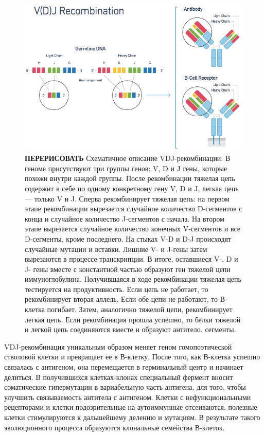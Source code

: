 \documentclass{spbau-diploma}
\begin{document}
\begin{figure}[h!]
    \centering
    \includegraphics[width=.9\textwidth]{figures/10x_vdj_recombination.png}
    \caption{\textbf{ПЕРЕРИСОВАТЬ} Схематичное описание VDJ-рекомбинации.
    В геноме присутствуют три группы генов: V, D и J гены, которые похожи внутри каждой группы.
    После рекомбинации тяжелая цепь содержит в себе по одному конкретному гену V, D и J, легкая цепь --- только V и J.
    Сперва рекомбинирует тяжелая цепь: на первом этапе рекомбинации вырезается случайное количество D-сегментов с конца и случайное количество J-сегментов с начала.
    На втором этапе вырезается случайное количество конечных V-сегментов и все D-сегменты, кроме последнего.
    На стыках V-D и D-J происходят случайные мутации и вставки.
    Лишние V- и J-гены затем вырезаются в процессе транскрипции.
    В итоге, оставшиеся V-, D и J- гены вместе с константной частью образуют ген тяжелой цепи иммуноглобулина.
    Получившаяся в ходе рекомбинации тяжелая цепь тестируется на продуктивность.
    Если цепь не работает, то рекомбинирует вторая аллель.
    Если обе цепи не работают, то В-клетка погибает.
    Затем, аналогично тяжелой цепи, рекомбинирует легкая цепь.
    Если рекомбинация прошла успешно, то белки тяжелой и легкой цепь соединяются вместе и образуют антитело.
    сегменты.}
    \label{10x_vdj_recombination}
\end{figure}

VDJ-рекомбинация уникальным образом меняет геном гомопоэтической стволовой клетки и превращает ее в В-клетку.
После того, как В-клетка успешно связалась с антигеном, она перемещается в герминальный центр и начинает делиться.
В получившихся клетках-клонах специальный фермент вносит соматические гипермутации в вариабельную часть антигена, для того, чтобы улучшить связываемость антитела с антигеном.
Клетки с нефункциональными рецепторами и клетки подозрительные на аутоиммунные отсеиваются, полезные клетки стимулируются к дальшейшему делению и мутациям.
В результате такого эволюционного процесса образуются клональные семейства В-клеток.
\end{document}
